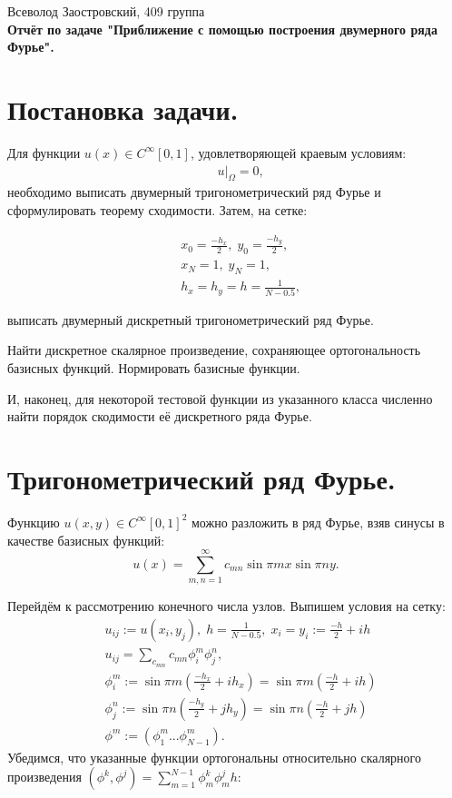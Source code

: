 \documentclass[14pt,a4paper]{extarticle}
\newcommand{\1}{\mathbbm{1}}
\begin{document}
\begin{center}

    {Всеволод Заостровский, 409 группа}\\
    {\bfseries Отчёт по задаче "Приближение с помощью построения двумерного ряда Фурье".\\}
    \vspace{1cm}

\end{center}

\section{Постановка задачи.}
Для функции $u(x) \in C^{\infty}[0, 1]$, удовлетворяющей краевым условиям:
\begin{align*}
     & u |_{\Omega} = 0,
\end{align*}
необходимо выписать двумерный тригонометрический ряд Фурье и сформулировать теорему сходимости. Затем, на сетке:

\begin{align*}
     & x_0 = \frac{-h_x}{2}, \; y_0 = \frac{-h_y}{2}, \\
     & x_N = 1, \; y_N = 1,                           \\
     & h_x = h_y = h = \frac{1}{N - 0.5},
\end{align*}

выписать двумерный дискретный тригонометрический ряд Фурье. \par
Найти дискретное скалярное произведение, сохраняющее ортогональность базисных функций.
Нормировать базисные функции.
\par
И, наконец, для некоторой тестовой функции из указанного класса численно найти порядок скодимости её дискретного ряда Фурье.

\section{Тригонометрический ряд Фурье.}
Функцию $u(x, y) \in C^{\infty}[0, 1]^2$ можно разложить в ряд Фурье,
взяв синусы в качестве базисных функций:
\begin{equation*}
    u(x) = \sum_{m, n = 1}^{\infty} c_{mn} \sin {\pi m x} \sin {\pi n y}.
\end{equation*}
\par
Перейдём к рассмотрению конечного числа узлов. Выпишем условия на сетку:
\begin{align*}
     & u_{ij} := u(x_i, y_j), \; h = \frac{1}{N - 0.5}, \; x_i = y_i := \frac{-h}{2} + i h \\
     & u_{ij} = \sum_{c_{mn}} c_{mn} \phi_i^m \phi_j^n,                                    \\
     & \phi_i^m := \sin{\pi m (\frac{-h_x}{2} + i h_x)} = \sin{\pi m (\frac{-h}{2} + i h)} \\
     & \phi_j^n := \sin{\pi n (\frac{-h_y}{2} + j h_y)} = \sin{\pi n (\frac{-h}{2} + j h)} \\
     & \phi^m := (\phi_1^m ... \phi_{N-1}^m).
\end{align*}
Убедимся, что указанные функции ортогональны относительно скалярного произведения
${(\phi^k, \phi^j) = \sum_{m = 1}^{N - 1}\phi_m^k \phi_m^j h}$:
\end{document}
